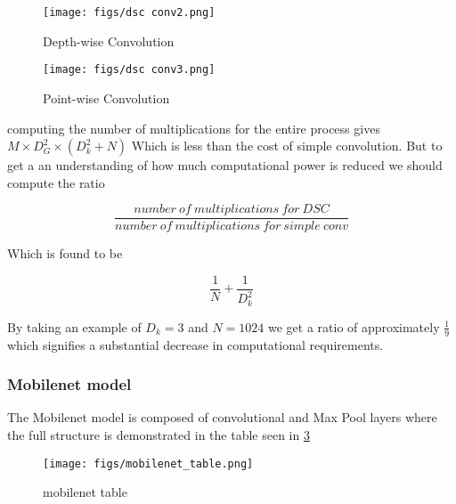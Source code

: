 \begin{figure}[ht]
	\centering
	\texttt{[image: figs/dsc conv2.png]}
	\caption{Depth-wise Convolution }\label{fig:dsc_conv2}
\end{figure}

\begin{figure}[ht]
	\centering
	\texttt{[image: figs/dsc conv3.png]}
	\caption{Point-wise Convolution }\label{fig:dsc_conv3}
\end{figure}

computing the number of multiplications for the entire process gives  $M \times D_{G}^{2} \times (D_{k}^{2}+N) $ Which is less than the cost of simple convolution. But to get a an understanding of how much computational power is reduced we should compute the ratio

$$
\frac{number\ of\ multiplications\ for\ DSC}{number\ of\ multiplications\ for\ simple\ conv}
$$

Which is found to be

$$
\frac{1}{N} + \frac{1}{D_{k}^2}
$$

By taking an example of $D_{k} = 3$ and $N = 1024$ we get a ratio of approximately $\frac{1}{9}$ which signifies a substantial decrease in computational requirements.

\subsubsection{Mobilenet model}

The Mobilenet model is composed of convolutional and Max Pool layers where the full structure is demonstrated in the table seen in \cref{fig:mobilenet_table}

\begin{figure}[!htpb]
	\centering
	\texttt{[image: figs/mobilenet\_table.png]}
	\caption{mobilenet table}\label{fig:mobilenet_table}
\end{figure}

